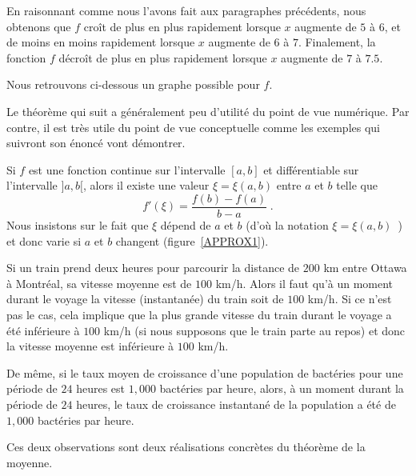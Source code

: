 {\begin{egg}
En raisonnant comme nous l'avons fait aux paragraphes précédents, nous
obtenons que $f$ croît de plus en plus rapidement lorsque $x$ augmente de $5$ à
$6$, et de moins en moins rapidement lorsque $x$ augmente de $6$ à
$7$.  Finalement, la fonction $f$ décroît de plus en plus rapidement
lorsque $x$ augmente de $7$ à $7.5$.

Nous retrouvons ci-dessous un graphe possible pour $f$.
\label{exDER21}
\end{egg}

Le théorème qui suit a généralement peu d'utilité du point de vue
numérique.  Par contre, il est très utile du point de vue conceptuelle
comme les exemples qui suivront son énoncé vont démontrer. 

\begin{theorem} \label{MVT}
Si $f$ est une fonction continue sur l'intervalle $[a,b]$ et
différentiable sur l'intervalle $]a,b[$, alors il existe une valeur
$\xi = \xi(a,b)$ entre $a$ et $b$ telle que
\[
f'(\xi) = \frac{f(b)-f(a)}{b-a} \; .
\]
Nous insistons sur le fait que $\xi$ dépend de $a$ et $b$ (d'où la
notation $\xi = \xi(a,b)$\ ) et donc varie si $a$ et $b$
changent (figure~\ref{APPROX1}). 
\end{theorem}


\begin{egg}
Si un train prend deux heures pour parcourir la distance de $200$ km
entre Ottawa à Montréal, sa vitesse moyenne est de $100$ km/h.  Alors
il faut qu'à un moment durant le voyage la vitesse (instantanée) du
train soit de $100$ km/h.  Si ce n'est pas le cas, cela implique que
la plus grande vitesse du train durant le voyage a été inférieure à
$100$ km/h (si nous supposons que le train parte au repos) et donc la
vitesse moyenne est inférieure à $100$ km/h.

De même, si le taux moyen de croissance d'une population de bactéries
pour une période de $24$ heures est $1,000$ bactéries par heure,
alors, à un moment durant la période de $24$ heures, le taux
de croissance instantané de la population a été de $1,000$ bactéries par
heure.

Ces deux observations sont deux réalisations concrètes du théorème de
la moyenne.
\end{egg}

}
